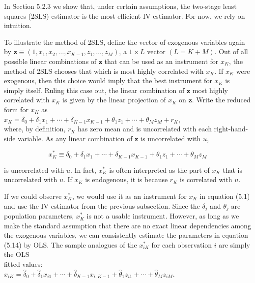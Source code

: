 \documentclass[10pt]{article}
\begin{document}
In Section 5.2.3 we show that, under certain assumptions, the two-stage least squares (2SLS) estimator is the most efficient IV estimator. For now, we rely on intuition.

To illustrate the method of 2SLS, define the vector of exogenous variables again by $\mathbf{z} \equiv\left(1, x_{1}, x_{2}, \ldots, x_{K-1}, z_{1}, \ldots, z_{M}\right)$, a $1 \times L$ vector $(L=K+M)$. Out of all possible linear combinations of $\mathbf{z}$ that can be used as an instrument for $x_{K}$, the method of 2SLS chooses that which is most highly correlated with $x_{K}$. If $x_{K}$ were exogenous, then this choice would imply that the best instrument for $x_{K}$ is simply itself. Ruling this case out, the linear combination of $\mathbf{z}$ most highly correlated with $x_{K}$ is given by the linear projection of $x_{K}$ on $\mathbf{z}$. Write the reduced form for $x_{K}$ as\\
$x_{K}=\delta_{0}+\delta_{1} x_{1}+\cdots+\delta_{K-1} x_{K-1}+\theta_{1} z_{1}+\cdots+\theta_{M} z_{M}+r_{K}$,\\
where, by definition, $r_{K}$ has zero mean and is uncorrelated with each right-hand-side variable. As any linear combination of $\mathbf{z}$ is uncorrelated with $u$,


\begin{equation*}
x_{K}^{*} \equiv \delta_{0}+\delta_{1} x_{1}+\cdots+\delta_{K-1} x_{K-1}+\theta_{1} z_{1}+\cdots+\theta_{M} z_{M} \tag{5.15}
\end{equation*}


is uncorrelated with $u$. In fact, $x_{K}^{*}$ is often interpreted as the part of $x_{K}$ that is uncorrelated with $u$. If $x_{K}$ is endogenous, it is because $r_{K}$ is correlated with $u$.

If we could observe $x_{K}^{*}$, we would use it as an instrument for $x_{K}$ in equation (5.1) and use the IV estimator from the previous subsection. Since the $\delta_{j}$ and $\theta_{j}$ are population parameters, $x_{K}^{*}$ is not a usable instrument. However, as long as we make the standard assumption that there are no exact linear dependencies among the exogenous variables, we can consistently estimate the parameters in equation (5.14) by OLS. The sample analogues of the $x_{i K}^{*}$ for each observation $i$ are simply the OLS\\
fitted values:\\
$\hat{x}_{i K}=\hat{\delta}_{0}+\hat{\delta}_{1} x_{i 1}+\cdots+\hat{\delta}_{K-1} x_{i, K-1}+\hat{\theta}_{1} z_{i 1}+\cdots+\hat{\theta}_{M} z_{i M}$.
\end{document}
